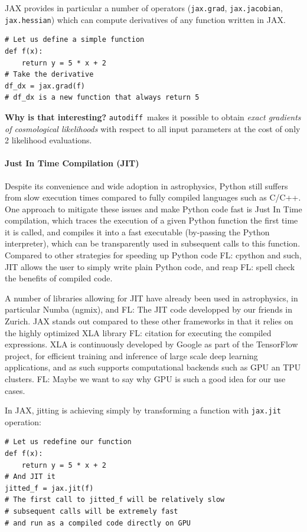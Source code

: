 \documentclass[twocolumn,twocolappendix,nofootinbib,iop]{openjournal}
\newcommand{\FrL}[1]{{\color{cyan}FL: #1}}
\newcommand{\autodiff}{\texttt{autodiff}}
\begin{document}
JAX provides in particular a number of operators (\texttt{jax.grad}, \texttt{jax.jacobian}, \texttt{jax.hessian}) which can compute derivatives of any function written in JAX.
\begin{lstlisting}[language=iPython]
# Let us define a simple function 
def f(x):
	return y = 5 * x + 2
# Take the derivative
df_dx = jax.grad(f)
# df_dx is a new function that always return 5 
\end{lstlisting}

\textbf{Why is that interesting?} \autodiff\ makes it possible to obtain \textit{exact gradients of cosmological likelihoods} with respect to all input parameters at the cost of only 2 likelihood evaluations.


\paragraph{Just In Time Compilation (JIT)} Despite its convenience and wide adoption in astrophysics, Python still suffers from slow execution times compared to fully compiled languages such as C/C++. One approach to mitigate these issues and make Python code fast is Just In Time compilation, which traces the execution of a given Python function the first time it is called, and compiles it into a fast executable (by-passing the Python interpreter), which can be transparently used in subsequent calls to this function. Compared to other strategies for speeding up Python code \FrL{cpython and such}, JIT allows the user to simply write plain Python code, and reap \FrL{spell check} the benefits of compiled code.

A number of libraries allowing for JIT have already been used in astrophysics, in particular Numba (ngmix), and \FrL{The JIT code developped by our friends in Zurich}. JAX stands out compared to these other frameworks in that it relies on the highly optimized XLA library \FrL{citation} for executing the compiled expressions. XLA is continuously developed by Google as part of the TensorFlow project, for efficient training and inference of large scale deep learning applications, and as such supports computational backends such as GPU an TPU clusters.
\FrL{Maybe we want to say why GPU is such a good idea for our use cases.}

In JAX, jitting is achieving simply by transforming a function with \texttt{jax.jit} operation:
\begin{lstlisting}[language=iPython]
# Let us redefine our function
def f(x):
	return y = 5 * x + 2
# And JIT it
jitted_f = jax.jit(f)
# The first call to jitted_f will be relatively slow
# subsequent calls will be extremely fast
# and run as a compiled code directly on GPU
\end{lstlisting}
\end{document}
